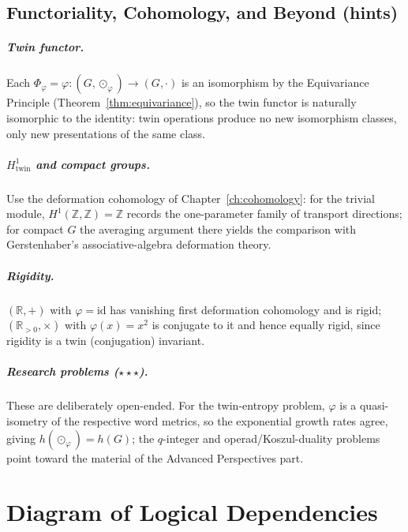 \documentclass[11pt,a4paper,openany]{book}
\theoremstyle{plain}
\theoremstyle{definition}
\newcommand{\twing}[1]{\odot_{#1}}
\newcommand{\RR}{\mathbb{R}}
\newcommand{\ZZ}{\mathbb{Z}}
\newcommand{\id}{\mathrm{id}}
\begin{document}
\section*{Functoriality, Cohomology, and Beyond (hints)}

\paragraph{Twin functor.}
Each $\Phi_\varphi=\varphi:(G,\twing{\varphi})\to(G,\cdot)$ is an isomorphism by the Equivariance Principle (Theorem~\ref{thm:equivariance}), so the twin functor is naturally isomorphic to the identity: twin operations produce no new isomorphism classes, only new presentations of the same class.

\paragraph{$H^1_{\mathrm{twin}}$ and compact groups.}
Use the deformation cohomology of Chapter~\ref{ch:cohomology}: for the trivial module, $H^1(\ZZ,\ZZ)=\ZZ$ records the one-parameter family of transport directions; for compact $G$ the averaging argument there yields the comparison with Gerstenhaber's associative-algebra deformation theory.

\paragraph{Rigidity.}
$(\RR,+)$ with $\varphi=\id$ has vanishing first deformation cohomology and is rigid; $(\RR_{>0},\times)$ with $\varphi(x)=x^2$ is conjugate to it and hence equally rigid, since rigidity is a twin (conjugation) invariant.

\paragraph{Research problems ($\star\star\star$).}
These are deliberately open-ended. For the twin-entropy problem, $\varphi$ is a quasi-isometry of the respective word metrics, so the exponential growth rates agree, giving $h(\twing{\varphi})=h(G)$; the $q$-integer and operad/Koszul-duality problems point toward the material of the Advanced Perspectives part.

\chapter{Diagram of Logical Dependencies}
\label{app:dependencies}
\end{document}
